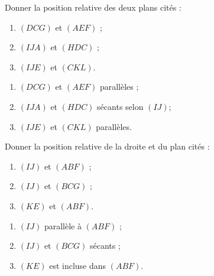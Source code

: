 \documentclass{cornouaille}
\begin{document}
\begin{exercice}
  Donner la position relative des deux plans cités :
  \begin{enumerate}
  \item $(DCG)$ et $(AEF)$ ;
  \item $(IJA)$ et $(HDC)$ ;
  \item $(IJE)$ et $(CKL)$.
  \end{enumerate}
\end{exercice}
\begin{solution}
  \begin{enumerate}
\item $(DCG)$ et $(AEF)$ parallèles ;
\item $(IJA)$ et $(HDC)$ sécants selon $(IJ)$;
\item $(IJE)$ et $(CKL)$ parallèles.
\end{enumerate}
\end{solution}

\begin{exercice}
  Donner la position relative de la droite et du plan cités :
  \begin{enumerate}
  \item $(IJ)$ et $(ABF)$ ;
  \item $(IJ)$ et $(BCG)$ ;
  \item $(KE)$ et $(ABF)$.
  \end{enumerate}
\end{exercice}
\begin{solution}
  \begin{enumerate}
  \item $(IJ)$ parallèle à $(ABF)$ ;
  \item $(IJ)$ et $(BCG)$ sécants ;
  \item $(KE)$ est incluse dans $(ABF)$.
  \end{enumerate}  
\end{solution}
\end{document}
